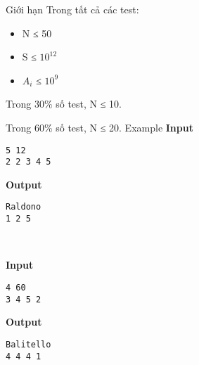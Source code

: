 Giới hạn
Trong tất cả các test:
\begin{itemize}
	\item N ≤ 50
	\item S ≤ $10^{12}$
	\item $A_{i}$ ≤ $10^{9}$
\end{itemize}

Trong 30\% số test, N ≤ 10.

Trong 60\% số test, N ≤ 20.
Example
\textbf{Input }
\begin{verbatim}
5 12
2 2 3 4 5\end{verbatim}

\textbf{Output }
\begin{verbatim}
Raldono
1 2 5\end{verbatim}

 

\textbf{Input }
\begin{verbatim}
4 60
3 4 5 2\end{verbatim}

\textbf{Output }
\begin{verbatim}
Balitello
4 4 4 1\end{verbatim}